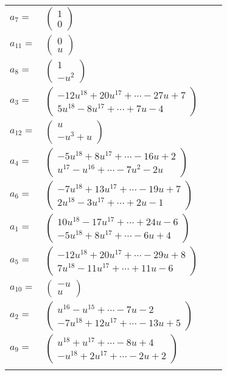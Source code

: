 \documentclass[1p]{elsarticle_modified}
\theoremstyle{definition}
\begin{document}
\begin{tabular}{m{7pt} m{180pt} m{7pt} m{180pt} }
\flushright $a_{7}=$&$\begin{pmatrix}1\\0\end{pmatrix}$ \\
\flushright $a_{11}=$&$\begin{pmatrix}0\\u\end{pmatrix}$ \\
\flushright $a_{8}=$&$\begin{pmatrix}1\\- u^2\end{pmatrix}$ \\
\flushright $a_{3}=$&$\begin{pmatrix}-12 u^{18}+20 u^{17}+\cdots-27 u+7\\5 u^{18}-8 u^{17}+\cdots+7 u-4\end{pmatrix}$ \\
\flushright $a_{12}=$&$\begin{pmatrix}u\\- u^3+u\end{pmatrix}$ \\
\flushright $a_{4}=$&$\begin{pmatrix}-5 u^{18}+8 u^{17}+\cdots-16 u+2\\u^{17}- u^{16}+\cdots-7 u^2-2 u\end{pmatrix}$ \\
\flushright $a_{6}=$&$\begin{pmatrix}-7 u^{18}+13 u^{17}+\cdots-19 u+7\\2 u^{18}-3 u^{17}+\cdots+2 u-1\end{pmatrix}$ \\
\flushright $a_{1}=$&$\begin{pmatrix}10 u^{18}-17 u^{17}+\cdots+24 u-6\\-5 u^{18}+8 u^{17}+\cdots-6 u+4\end{pmatrix}$ \\
\flushright $a_{5}=$&$\begin{pmatrix}-12 u^{18}+20 u^{17}+\cdots-29 u+8\\7 u^{18}-11 u^{17}+\cdots+11 u-6\end{pmatrix}$ \\
\flushright $a_{10}=$&$\begin{pmatrix}- u\\u\end{pmatrix}$ \\
\flushright $a_{2}=$&$\begin{pmatrix}u^{16}- u^{15}+\cdots-7 u-2\\-7 u^{18}+12 u^{17}+\cdots-13 u+5\end{pmatrix}$ \\
\flushright $a_{9}=$&$\begin{pmatrix}u^{18}+u^{17}+\cdots-8 u+4\\- u^{18}+2 u^{17}+\cdots-2 u+2\end{pmatrix}$\\&\end{tabular}
\end{document}
